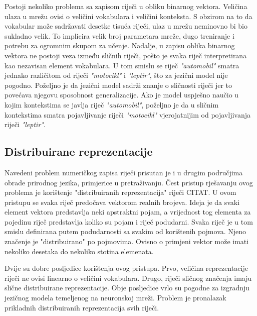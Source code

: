 \documentclass[times, utf8, diplomski, numeric]{fer}
\begin{document}
Postoji nekoliko problema sa zapisom riječi u obliku binarnog vektora. Veličina ulaza u mrežu ovisi o veličini vokabulara i veličini konteksta. S obzirom na to da vokabular može sadržavati desetke tisuća riječi, ulaz u mrežu neminovno bi bio sukladno velik. To implicira velik broj parametara mreže, dugo treniranje i potrebu za ogromnim skupom za učenje. Nadalje, u zapisu oblika binarnog vektora ne postoji veza između sličnih riječi, pošto je svaka riječ interpretirana kao nezavisan element vokabulara. U tom smislu se riječ \textit{"automobil"} smatra jednako različitom od riječi \textit{"motocikl"} i \textit{"leptir"}, što za jezični model nije pogodno. Poželjno je da jezični model sadrži znanje o sličnosti riječi jer to povećava njegovu sposobnost generalizacije. Ako je model uspješno naučio u kojim kontekstima se javlja riječ \textit{"automobil"}, poželjno je da u sličnim kontekstima smatra pojavljivanje riječi \textit{"motocikl"} vjerojatnijim od pojavljivanja riječi \textit{"leptir"}.

\subsection{Distribuirane reprezentacije}

Navedeni problem numeričkog zapisa riječi prisutan je i u drugim područjima obrade prirodnog jezika, primjerice u pretraživanju. Čest pristup rješavanju ovog problema je korištenje "distribuiranih reprezentacija"  riječi CITAT. U ovom pristupu se svaka riječ predočava vektorom realnih brojeva. Ideja je da svaki element vektora predstavlja neki apstraktni pojam, a vrijednost tog elementa za pojedinu riječ predstavlja koliko su pojam i riječ podudarni. Svaka riječ je u tom smislu definirana putem podudarnosti sa svakim od korištenih pojmova. Njeno značenje je "distribuirano" po pojmovima. Ovisno o primjeni vektor može imati nekoliko desetaka do nekoliko stotina elemenata.

Dvije su dobre posljedice korištenja ovog pristupa. Prvo, veličina reprezentacije riječi ne ovisi linearno o veličini vokabulara. Drugo, riječi sličnog značenja imaju slične distribuirane reprezentacije. Obje posljedice vrlo su pogodne za izgradnju jezičnog modela temeljenog na neuronskoj mreži. Problem je pronalazak prikladnih distribuiranih reprezentacija svih riječi.
\end{document}
